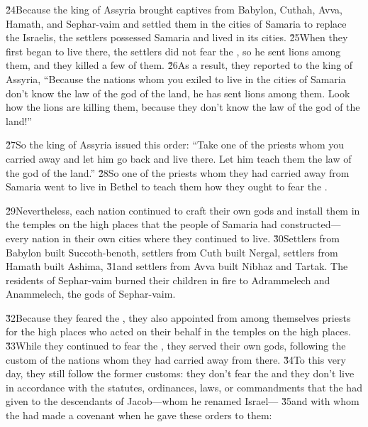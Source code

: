\v{24}Because the king of Assyria brought captives from Babylon, Cuthah, Avva, Hamath, and Sephar-vaim and settled them in the cities of Samaria to replace the Israelis, the settlers possessed Samaria and lived in its cities. \v{25}When they first began to live there, the settlers did not fear the , so he sent lions among them, and they killed a few of them. \v{26}As a result, they reported to the king of Assyria, ``Because the nations whom you exiled to live in the cities of Samaria don't know the law of the god of the land, he has sent lions among them. Look how the lions are killing them, because they don't know the law of the god of the land!''

\v{27}So the king of Assyria issued this order: ``Take one of the priests whom you carried away and let him go back and live there. Let him teach them the law of the god of the land.'' \v{28}So one of the priests whom they had carried away from Samaria went to live in Bethel to teach them how they ought to fear the .

\v{29}Nevertheless, each nation continued to craft their own gods and install them in the temples on the high places that the people of Samaria had constructed---every nation in their own cities where they continued to live. \v{30}Settlers from Babylon built Succoth-benoth, settlers from Cuth built Nergal, settlers from Hamath built Ashima, \v{31}and settlers from Avva built Nibhaz and Tartak. The residents of Sephar-vaim burned their children in fire to Adrammelech and Anammelech, the gods of Sephar-vaim.

\v{32}Because they feared the , they also appointed from among themselves priests for the high places who acted on their behalf in the temples on the high places. \v{33}While they continued to fear the , they served their own gods, following the custom of the nations whom they had carried away from there. \v{34}To this very day, they still follow the former customs: they don't fear the  and they don't live in accordance with the statutes, ordinances, laws, or commandments that the  had given to the descendants of Jacob---whom he renamed Israel--- \v{35}and with whom the  had made a covenant when he gave these orders to them:

